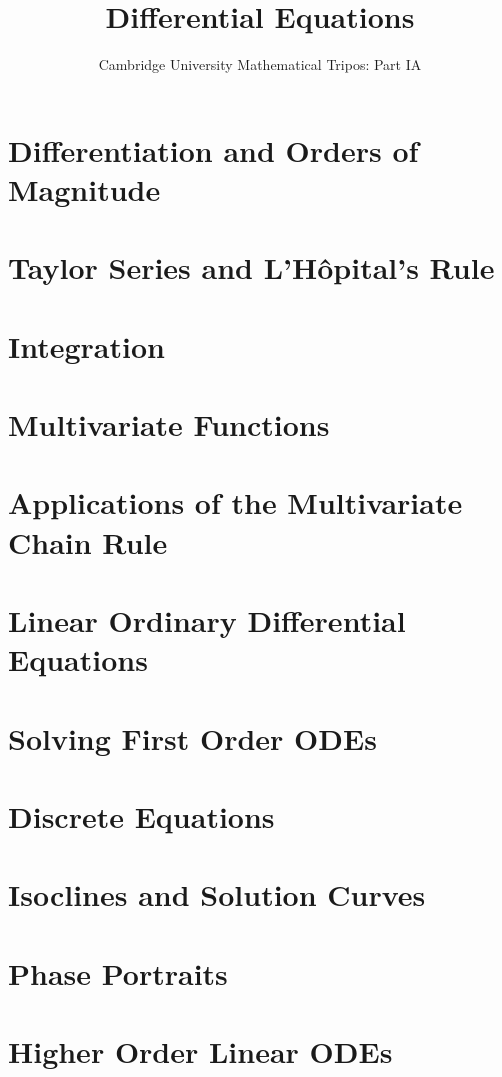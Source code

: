 \documentclass{article}
\title{Differential Equations}
\author{Cambridge University Mathematical Tripos: Part IA}
\begin{document}
\maketitle

\tableofcontentsnewpage

\section{Differentiation and Orders of Magnitude}

\section{Taylor Series and L'H\^opital's Rule}

\section{Integration}

\section{Multivariate Functions}

\section{Applications of the Multivariate Chain Rule}

\section{Linear Ordinary Differential Equations}

\section{Solving First Order ODEs}

\section{Discrete Equations}

\section{Isoclines and Solution Curves}

\section{Phase Portraits}

\section{Higher Order Linear ODEs}

\end{document}
